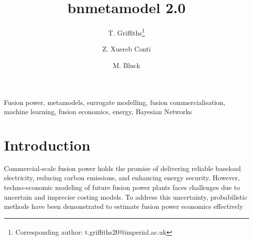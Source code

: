 \documentclass[journal]{IEEEtran}
\begin{document}
\title{bnmetamodel 2.0}

\author[1]{T. Griffiths\thanks{\textsuperscript{\Cross}Corresponding author: t.griffiths20@imperial.ac.uk}}
\author[2]{Z. Xuereb Conti}
\author[1]{M. Bluck}

\vspace{-15pt}

\maketitle

\begin{abstract}

\end{abstract}

\begin{IEEEkeywords}
Fusion power, metamodels, surrogate modelling, fusion commercialisation, machine learning, fusion economics, energy, Bayesian Networks
\end{IEEEkeywords}
\vspace{-2ex}

\section{Introduction}

Commercial-scale fusion power holds the promise of delivering reliable baseload electricity, reducing carbon emissions, and enhancing energy security. However, techno-economic modeling of future fusion power plants faces challenges due to uncertain and imprecise costing models. To address this uncertainty, probabilistic methods have been demonstrated to estimate fusion power economics effectively~\cite{Griffiths2024}
\end{document}
